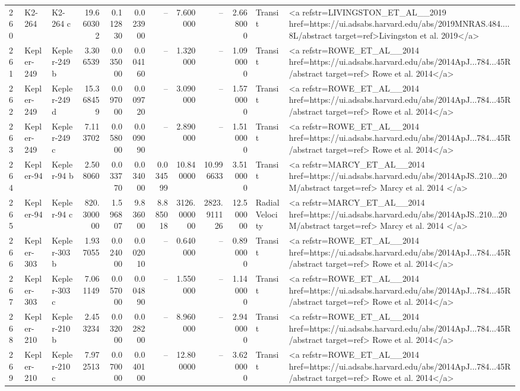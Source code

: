\begin{tabular}{lllrrrrrrrll}
260 & K2-264 & K2-264 c & 19.660302 & 0.112830 & 0.023900 & -- & 7.600000 & -- & 2.668000 & Transit & <a refstr=LIVINGSTON_ET_AL__2019 href=https://ui.adsabs.harvard.edu/abs/2019MNRAS.484....8L/abstract target=ref>Livingston et al. 2019</a> \\
261 & Kepler-249 & Kepler-249 b & 3.306539 & 0.035000 & 0.004160 & -- & 1.320000 & -- & 1.090000 & Transit & <a refstr=ROWE_ET_AL__2014 href=https://ui.adsabs.harvard.edu/abs/2014ApJ...784...45R/abstract target=ref> Rowe et al. 2014</a> \\
262 & Kepler-249 & Kepler-249 d & 15.368459 & 0.097000 & 0.009720 & -- & 3.090000 & -- & 1.570000 & Transit & <a refstr=ROWE_ET_AL__2014 href=https://ui.adsabs.harvard.edu/abs/2014ApJ...784...45R/abstract target=ref> Rowe et al. 2014</a> \\
263 & Kepler-249 & Kepler-249 c & 7.113702 & 0.058000 & 0.009090 & -- & 2.890000 & -- & 1.510000 & Transit & <a refstr=ROWE_ET_AL__2014 href=https://ui.adsabs.harvard.edu/abs/2014ApJ...784...45R/abstract target=ref> Rowe et al. 2014</a> \\
264 & Kepler-94 & Kepler-94 b & 2.508060 & 0.033770 & 0.034000 & 0.034599 & 10.840000 & 10.996633 & 3.510000 & Transit & <a refstr=MARCY_ET_AL__2014 href=https://ui.adsabs.harvard.edu/abs/2014ApJS..210...20M/abstract target=ref> Marcy et al. 2014 </a> \\
265 & Kepler-94 & Kepler-94 c & 820.300000 & 1.596807 & 9.836000 & 8.885018 & 3126.000000 & 2823.911126 & 12.500000 & Radial Velocity & <a refstr=MARCY_ET_AL__2014 href=https://ui.adsabs.harvard.edu/abs/2014ApJS..210...20M/abstract target=ref> Marcy et al. 2014 </a> \\
266 & Kepler-303 & Kepler-303 b & 1.937055 & 0.024000 & 0.002010 & -- & 0.640000 & -- & 0.890000 & Transit & <a refstr=ROWE_ET_AL__2014 href=https://ui.adsabs.harvard.edu/abs/2014ApJ...784...45R/abstract target=ref> Rowe et al. 2014</a> \\
267 & Kepler-303 & Kepler-303 c & 7.061149 & 0.057000 & 0.004890 & -- & 1.550000 & -- & 1.140000 & Transit & <a refstr=ROWE_ET_AL__2014 href=https://ui.adsabs.harvard.edu/abs/2014ApJ...784...45R/abstract target=ref> Rowe et al. 2014</a> \\
268 & Kepler-210 & Kepler-210 b & 2.453234 & 0.032000 & 0.028200 & -- & 8.960000 & -- & 2.940000 & Transit & <a refstr=ROWE_ET_AL__2014 href=https://ui.adsabs.harvard.edu/abs/2014ApJ...784...45R/abstract target=ref> Rowe et al. 2014</a> \\
269 & Kepler-210 & Kepler-210 c & 7.972513 & 0.070000 & 0.040100 & -- & 12.800000 & -- & 3.620000 & Transit & <a refstr=ROWE_ET_AL__2014 href=https://ui.adsabs.harvard.edu/abs/2014ApJ...784...45R/abstract target=ref> Rowe et al. 2014</a> \\

\end{tabular}
